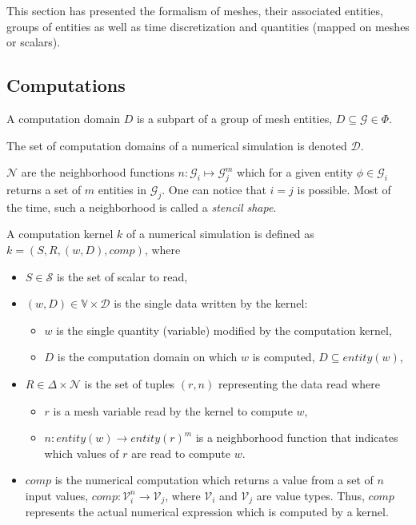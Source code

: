 \medskip

This section has presented the formalism of meshes, their associated entities, groups of entities as well as time discretization and quantities (mapped on meshes or scalars).

\subsection{Computations}

\medskip
\begin{mydefs}
\item A computation domain $D$ is a subpart of a group of mesh entities, $D \subseteq \mathcal{G} \in \Phi$.
\item The set of computation domains of a numerical simulation is denoted $\mathcal{D}$.
\item $\mathcal{N}$ are the neighborhood functions $n: \mathcal{G}_i \mapsto \mathcal{G}_j^m$ which for a given entity $\phi \in \mathcal{G}_i$ returns a set of $m$ entities in $\mathcal{G}_j$. One can notice that $i = j$ is possible. Most of the time, such a neighborhood is called a \emph{stencil shape}.
\end{mydefs}

\begin{mydef}
A computation kernel $k$ of a numerical simulation is defined as $k=(S,R,(w,D),comp)$, where
\begin{itemize}
\item $S \in \mathcal{S}$ is the set of scalar to read,
\item $(w,D) \in \mathbb{V} \times \mathcal{D}$ is the single data written by the kernel:
\begin{itemize}
  \item $w$ is the single quantity (variable) modified by the computation kernel,
  \item $D$ is the computation domain on which $w$ is computed, $D \subseteq entity(w)$,
\end{itemize}
\item $R \in \Delta \times \mathcal{N}$ is the set of tuples $(r,n)$ representing the data read where
\begin{itemize}
  \item $r$ is a mesh variable read by the kernel to compute $w$,
  \item $n : entity(w) \rightarrow entity(r)^m$ is a neighborhood function that indicates which values of $r$ are read to compute $w$.
\end{itemize}
\item $comp$ is the numerical computation which returns a value from a set of $n$ input values, $comp: \mathcal{V}_i^n \rightarrow \mathcal{V}_j$, where $\mathcal{V}_i$ and $\mathcal{V}_j$ are value types. Thus, $comp$ represents the actual numerical expression which is computed by a kernel.
\end{itemize}
\end{mydef}

